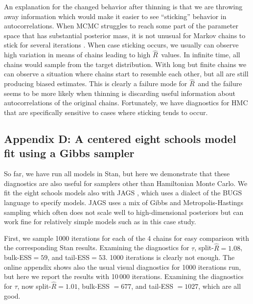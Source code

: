 \documentclass[american,]{article}
\newcommand{\Rhat}{$\widehat{R}$}
\theoremstyle{definition}
\begin{document}
An explanation for the changed behavior after thinning is that we are
throwing away information which would make it easier to see
``sticking'' behavior in autocorrelations.  When MCMC struggles to
reach some part of the parameter space that has substantial posterior
mass, it is not unusual for Markov chains to stick for several
iterations \citep[see, e.g.][]{Neal:2003,Betancourt+Girolami:2019}. When
case sticking occurs, we usually can observe high variation in means
of chains leading to high \Rhat\ values. In infinite time, all chains
would sample from the target distribution. With long but finite
chains we can observe a situation where chains start to resemble each
other, but all are still producing biased estimates. This is clearly a
failure mode for \Rhat\ and the failure seems to be more likely when
thinning is discarding useful information about autocorrelations of
the original chains. Fortunately, we have diagnostics for HMC that
are specifically sensitive to cases where sticking tends to occur.

\hypertarget{eight-schools-with-jags}{%
\subsection*{Appendix D: A centered eight schools model fit using a Gibbs sampler}\label{eight-schools-with-jags}}

So far, we have run all models in Stan, but here we demonstrate that
these diagnostics are  also useful for samplers other than 
Hamiltonian Monte Carlo.  We fit the eight schools models also with
 JAGS \citep{plummer2003jags}, which uses a dialect of the BUGS
language \citep{BUGSproject:2009} to specify models. JAGS uses a 
mix of Gibbs and Metropolis-Hastings sampling which often does
not scale well to high-dimensional posteriors
\citep[see, e.g.][]{Hoffman+Gelman:2014} but can
work fine for relatively simple models such as in this case study.


First, we sample 1000 iterations for each of the 4 chains for easy
comparison with the corresponding Stan results. Examining the
diagnostics for $\tau$, split-\(\widehat{R}=1.08\), bulk-ESS$=59$, and
tail-ESS$=53$. 1000 iterations is clearly not enough. The online
appendix shows also the usual visual diagnostics for 1000 iterations
run, but here we report the results with 10\,000 iterations.
Examining the diagnostics for $\tau$, now split-\(\widehat{R}=1.01\),
bulk-ESS $=677$, and tail-ESS $=1027$, which are all good.
\end{document}
